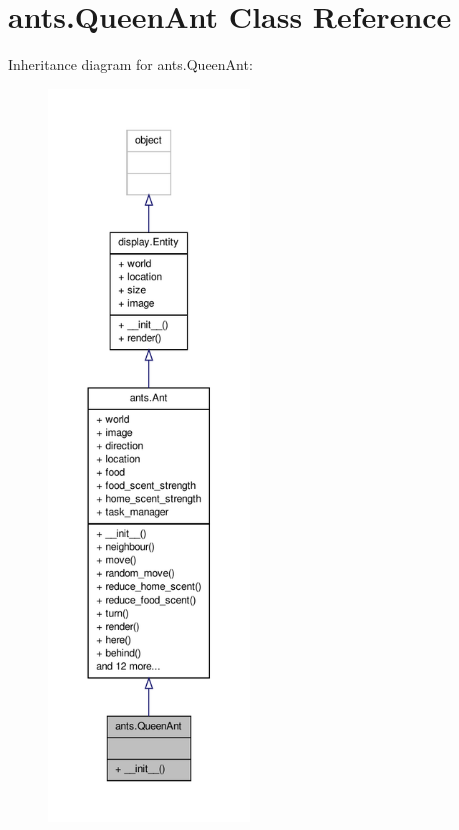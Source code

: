 \hypertarget{classants_1_1QueenAnt}{\section{ants.\+Queen\+Ant Class Reference}
\label{classants_1_1QueenAnt}
}


Inheritance diagram for ants.\+Queen\+Ant\+:
\nopagebreak
\begin{figure}[H]
\begin{center}
\leavevmode
\includegraphics[height=550pt]{classants_1_1QueenAnt__inherit__graph}
\end{center}
\end{figure}


